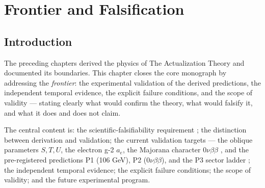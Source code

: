 %
%


\chapter{Frontier and Falsification}
\label{c14:chap:frontier}

\section{Introduction}
\label{c14:sec:frontier-introduction}

The preceding chapters derived the physics of The Actualization Theory and documented its
boundaries. This chapter closes the core monograph by addressing the \emph{frontier}: the
experimental validation of the derived predictions, the independent temporal evidence, the
explicit failure conditions, and the scope of validity --- stating clearly what would
confirm the theory, what would falsify it, and what it does and does not claim.

The central content is: the scientific-falsifiability requirement \cite{c14:QG299}; the
distinction between derivation and validation; the current validation targets --- the
oblique parameters $S,T,U$, the electron g-2 $a_e$, the Majorana character $0\nu\beta\beta$
\cite{c14:VALID001}, and the pre-registered predictions P1 (106 GeV), P2 ($0\nu\beta\beta$), and the P3
sector ladder \cite{c14:QG190,c14:QG199,c14:QG200,c14:QG201,c14:QG202,c14:QG203}; the independent temporal evidence;
the explicit failure conditions; the scope of validity; and the future experimental program.

